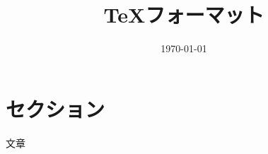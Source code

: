 \documentclass[a4paper,10pt]{ltjsarticle} %
\title{TeXフォーマット}
\date{\today}
\begin{document}
\maketitle


\section{セクション}
文章
\end{document}
